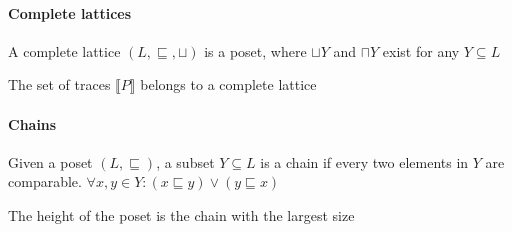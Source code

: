 \paragraph{Complete lattices}
\enumstart
	\item A complete lattice $(L, \sqsubseteq, \sqcup)$ is a poset, where $\sqcup Y$ and $\sqcap Y$ exist for any $Y \subseteq L$
	\item The set of traces $\llbracket P \rrbracket$ belongs to a complete lattice
\enumend

\paragraph{Chains}
\enumstart
	\item Given a poset $(L, \sqsubseteq)$, a subset $Y \subseteq L$ is a chain if every two elements in $Y$ are comparable. $\forall x,y \in Y: (x \sqsubseteq y) \lor (y \sqsubseteq x)$
	\item The height of the poset is the chain with the largest size
\enumend
